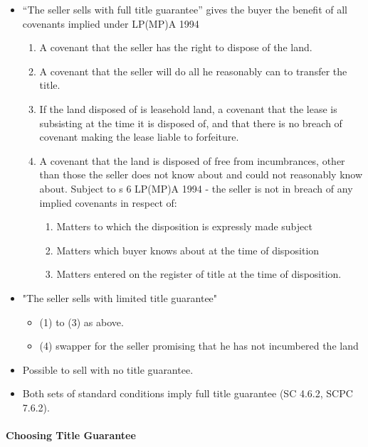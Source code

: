 \documentclass[
]{article}
\providecommand{\tightlist}{%
  \setlength{\itemsep}{0pt}\setlength{\parskip}{0pt}}
\begin{document}
\begin{itemize}
\tightlist
\item
  ``The seller sells with full title guarantee'' gives the buyer the
  benefit of all covenants implied under LP(MP)A 1994

  \begin{enumerate}
  \tightlist
  \item
    A covenant that the seller has the right to dispose of the land.
  \item
    A covenant that the seller will do all he reasonably can to transfer
    the title.
  \item
    If the land disposed of is leasehold land, a covenant that the lease
    is subsisting at the time it is disposed of, and that there is no
    breach of covenant making the lease liable to forfeiture.
  \item
    A covenant that the land is disposed of free from incumbrances,
    other than those the seller does not know about and could not
    reasonably know about. Subject to s 6 LP(MP)A 1994 - the seller is
    not in breach of any implied covenants in respect of:

    \begin{enumerate}
    \tightlist
    \item
      Matters to which the disposition is expressly made subject
    \item
      Matters which buyer knows about at the time of disposition
    \item
      Matters entered on the register of title at the time of
      disposition.
    \end{enumerate}
  \end{enumerate}
\item
  "The seller sells with limited title guarantee"

  \begin{itemize}
  \tightlist
  \item
    (1) to (3) as above.
  \item
    (4) swapper for the seller promising that he has not incumbered the
    land
  \end{itemize}
\item
  Possible to sell with no title guarantee.
\item
  Both sets of standard conditions imply full title guarantee (SC 4.6.2,
  SCPC 7.6.2).
\end{itemize}

\hypertarget{choosing-title-guarantee}{%
\paragraph{Choosing Title Guarantee}\label{choosing-title-guarantee}}
\end{document}
